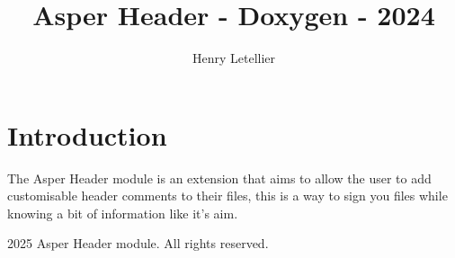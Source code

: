 \documentclass{article}
\begin{document}
\title{Asper Header - Doxygen - 2024}
\author{Henry Letellier}
\date{}
\maketitle

\section{Introduction}
The Asper Header module is an extension that aims to allow the user to add customisable header comments to their files, this is a way to sign you files while knowing a bit of information like it's aim.

\lipsum[1-10]

\clearpage
\thispagestyle{empty} %
\begin{center}
    \small \textcopyright{} 2025 Asper Header module. All rights reserved.
\end{center}
\end{document}
